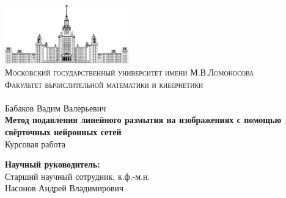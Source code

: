 \begin{titlepage}

\center %

{
\renewcommand{\headrulewidth}{0pt}
}

\thispagestyle{firststyle}



 \includegraphics[width=0.4\textwidth]{./pics/msu_logo}\\[0.2cm] %


\textsc{\small Московский государственный университет имени М.В.Ломоносова}\\ %
\textsc{\small Факультет вычислительной математики и кибернетики}\\ %
\textsc{\small  }\\[3cm] %

{
	Бабаков Вадим Валерьевич
} \\[1cm]
{ \Large \bfseries
	Метод подавления линейного размытия на изображениях с помощью свёрточных нейронных сетей
} \\[1cm]
{ \Large
	Курсовая работа
}\\[2.5cm] %
 

\vfill
\begin{flushright}
\large 
\textbf{Научный руководитель:}\\
Старший научный сотрудник, к.ф.-м.н.\\
Насонов Андрей Владимирович
\end{flushright}
 

\vfill %

\end{titlepage}%
